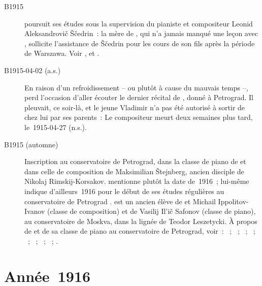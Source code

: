 \begin{description}
 \item[B1915]
 \VSofronitsky{} poursuit ses études sous la supervision du pianiste et
 compositeur Leonid Aleksandrovič Ščedrin~: la mère de \Sofronitsky{}, qui
 n'a jamais manqué une leçon avec \AMichalowski{}, sollicite l'assistance de
 Ščedrin pour les cours de son fils après la période de Warszawa.
 Voir \citet[p.~422]{Milshteyn82a}, \citet[p.~6]{White} et
 \citet[p.~55]{Juban}.
 \item[B1915-04-02 (a.s.)]
 En raison d'un refroidissement -- ou plutôt à cause du mauvais temps --,
 \VSofronitsky{} perd l'occasion d'aller écouter le dernier récital de
 \Scriabine{}, donné à Petrograd.
 Il pleuvait, ce soir-là, et le jeune Vladimir n'a pas été autorisé à sortir
 de chez lui par ses parents~:  \citep[p.~88.]{Nikonovich08a}
 Le compositeur meurt deux semaines plus tard, le~1915-04-27 (n.s.).
 \item[B1915 (automne)]
 Inscription au conservatoire de Petrograd, dans la classe de piano de
 \LNikolaiev{} et dans celle de composition de Maksimilian Štejnberg, ancien
 disciple de Nikolaj Rimskij-Korsakov.
 \citet[p.~55]{Juban} mentionne plutôt la date de~1916~; \VSofronitsky{}
 lui-même indique d'ailleurs~1916 pour le début de ses études régulières au
 conservatoire de Petrograd \citep[voir][p.~422]{Milshteyn82a}.
 \LNikolaiev{} est un ancien élève de \STaneiev{} et Michail
 Ippolitov-Ivanov (classe de composition) et de Vasilij Il'ič Safonov
 (classe de piano), au conservatoire de Moskva, dans la lignée de Teodor
 Leszetycki.
 À propos de \LNikolaiev{} et de sa classe de piano au conservatoire de
 Petrograd, voir~: \citet{Alshvang39}~; \citet[p.~70-71]{Bogdanov67b}~;
 \citet{Delson35}~; \citet[p.~140-142]{Nekrasova08}~; \citet{Nikolaiev13}~;
 \citet[p.~\hbox{5-9} et~85-86]{Artese}~; \citet{Chkourak10}~;
 \citet[p.~55-56]{Juban}~; \citet[p.~6 et~108-111]{White}.
\end{description}

\section{Année~1916}


